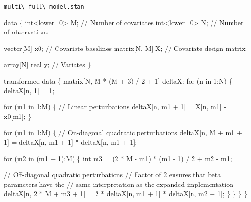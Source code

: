\documentclass[
  letterpaper,
  DIV=11,
  numbers=noendperiod]{scrartcl}
\newenvironment{Shaded}{\begin{snugshade}}{\end{snugshade}}
\newcommand{\CommentTok}[1]{\textcolor[rgb]{0.37,0.37,0.37}{#1}}
\newcommand{\ControlFlowTok}[1]{\textcolor[rgb]{0.00,0.23,0.31}{#1}}
\newcommand{\DataTypeTok}[1]{\textcolor[rgb]{0.68,0.00,0.00}{#1}}
\newcommand{\DecValTok}[1]{\textcolor[rgb]{0.68,0.00,0.00}{#1}}
\newcommand{\KeywordTok}[1]{\textcolor[rgb]{0.00,0.23,0.31}{#1}}
\newcommand{\NormalTok}[1]{\textcolor[rgb]{0.00,0.23,0.31}{#1}}
\begin{document}
\begin{codelisting}

\caption{\texttt{multi\textbackslash\_full\textbackslash\_model.stan}}

\begin{Shaded}
\begin{Highlighting}[]
\KeywordTok{data}\NormalTok{ \{}
  \DataTypeTok{int}\NormalTok{\textless{}}\KeywordTok{lower}\NormalTok{=}\DecValTok{0}\NormalTok{\textgreater{} M;  }\CommentTok{// Number of covariates}
  \DataTypeTok{int}\NormalTok{\textless{}}\KeywordTok{lower}\NormalTok{=}\DecValTok{0}\NormalTok{\textgreater{} N;  }\CommentTok{// Number of observations}
  
  \DataTypeTok{vector}\NormalTok{[M] x0;    }\CommentTok{// Covariate baselines}
  \DataTypeTok{matrix}\NormalTok{[N, M] X;  }\CommentTok{// Covariate design matrix}
  
  \DataTypeTok{array}\NormalTok{[N] }\DataTypeTok{real}\NormalTok{ y; }\CommentTok{// Variates}
\NormalTok{\}}

\KeywordTok{transformed data}\NormalTok{ \{}
  \DataTypeTok{matrix}\NormalTok{[N, M * (M + }\DecValTok{3}\NormalTok{) / }\DecValTok{2}\NormalTok{ + }\DecValTok{1}\NormalTok{] deltaX;}
  \ControlFlowTok{for}\NormalTok{ (n }\ControlFlowTok{in} \DecValTok{1}\NormalTok{:N) \{}
\NormalTok{    deltaX[n, }\DecValTok{1}\NormalTok{] = }\DecValTok{1}\NormalTok{;}
    
    \ControlFlowTok{for}\NormalTok{ (m1 }\ControlFlowTok{in} \DecValTok{1}\NormalTok{:M) \{}
      \CommentTok{// Linear perturbations}
\NormalTok{      deltaX[n, m1 + }\DecValTok{1}\NormalTok{] = X[n, m1] {-} x0[m1];}
\NormalTok{    \}}
    
    \ControlFlowTok{for}\NormalTok{ (m1 }\ControlFlowTok{in} \DecValTok{1}\NormalTok{:M) \{}
      \CommentTok{// On{-}diagonal quadratic perturbations}
\NormalTok{      deltaX[n, M + m1 + }\DecValTok{1}\NormalTok{] }
\NormalTok{        = deltaX[n, m1 + }\DecValTok{1}\NormalTok{] * deltaX[n, m1 + }\DecValTok{1}\NormalTok{];}
  
      \ControlFlowTok{for}\NormalTok{ (m2 }\ControlFlowTok{in}\NormalTok{ (m1 + }\DecValTok{1}\NormalTok{):M) \{}
        \DataTypeTok{int}\NormalTok{ m3 = (}\DecValTok{2}\NormalTok{ * M {-} m1) * (m1 {-} }\DecValTok{1}\NormalTok{) / }\DecValTok{2}\NormalTok{ + m2 {-} m1;}
          
        \CommentTok{// Off{-}diagonal quadratic perturbations}
        \CommentTok{// Factor of 2 ensures that beta parameters have the}
        \CommentTok{// same interpretation as the expanded implementation}
\NormalTok{        deltaX[n, }\DecValTok{2}\NormalTok{ * M + m3 + }\DecValTok{1}\NormalTok{] }
\NormalTok{          = }\DecValTok{2}\NormalTok{ * deltaX[n, m1 + }\DecValTok{1}\NormalTok{] * deltaX[n, m2 + }\DecValTok{1}\NormalTok{];}
\NormalTok{      \}}
\NormalTok{    \}}
\NormalTok{  \}}
\NormalTok{\}}


\end{Highlighting}
\end{Shaded}
\end{codelisting}
\end{document}
